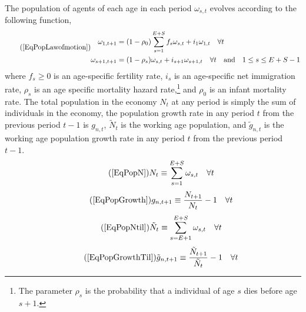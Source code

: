 \documentclass[letterpaper,12pt]{article}
\theoremstyle{definition}
\begin{document}
    The population of agents of each age in each period $\omega_{s,t}$ evolves according to the following function,
    \begin{equation}\tag{\ref{EqPopLawofmotion}}
      \begin{split}
        \omega_{1,t+1} &= (1 - \rho_0)\sum_{s=1}^{E+S} f_s\omega_{s,t} + i_1\omega_{1,t}\quad\forall t \\
        \omega_{s+1,t+1} &= (1 - \rho_s)\omega_{s,t} + i_{s+1}\omega_{s+1,t}\quad\forall t\quad\text{and}\quad 1\leq s \leq E+S-1
      \end{split}
    \end{equation}
    where $f_s\geq 0$ is an age-specific fertility rate, $i_s$ is an age-specific net immigration rate, $\rho_s$ is an age specific mortality hazard rate,\footnote{The parameter $\rho_s$ is the probability that a individual of age $s$ dies before age $s+1$.} and $\rho_0$ is an infant mortality rate. The total population in the economy $N_t$ at any period is simply the sum of individuals in the economy, the population growth rate in any period $t$ from the previous period $t-1$ is $g_{n,t}$, $\tilde{N}_t$ is the working age population, and $\tilde{g}_{n,t}$ is the working age population growth rate in any period $t$ from the previous period $t-1$.
    \begin{equation}\tag{\ref{EqPopN}}
      N_t\equiv\sum_{s=1}^{E+S} \omega_{s,t} \quad\forall t
    \end{equation}
    \begin{equation}\tag{\ref{EqPopGrowth}}
      g_{n,t+1} \equiv \frac{N_{t+1}}{N_t} - 1 \quad\forall t
    \end{equation}
    \begin{equation}\tag{\ref{EqPopNtil}}
      \tilde{N}_t\equiv\sum_{s=E+1}^{E+S} \omega_{s,t} \quad\forall t
    \end{equation}
    \begin{equation}\tag{\ref{EqPopGrowthTil}}
      \tilde{g}_{n,t+1} \equiv \frac{\tilde{N}_{t+1}}{\tilde{N}_t} - 1 \quad\forall t
    \end{equation}
\end{document}
